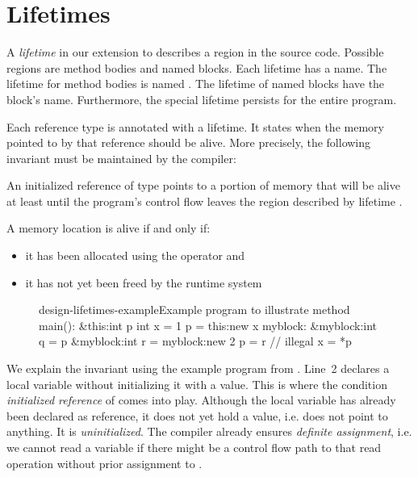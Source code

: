 \section{Lifetimes}\label{section:design-lifetimes}

A \emph{lifetime} in our extension to \whiley describes a region in the source code.
Possible regions are method bodies and named blocks.
Each lifetime has a name.
The lifetime for method bodies is named .
The lifetime of named blocks have the block's name.
Furthermore, the special lifetime \whileyinline{*} persists for the entire program.

Each reference type is annotated with a lifetime.
It states when the memory pointed to by that reference should be alive.
More precisely, the following invariant must be maintained by the compiler:

\begin{invariant}\label{invariant:alive}
An initialized reference of type  points to a portion of memory that will be alive at least until the program's control flow leaves the region described by lifetime .
\end{invariant}

\begin{definition}\label{definition:alive}
A memory location is alive if and only if:
\begin{itemize}
\item it has been allocated using the  operator and
\item it has not yet been freed by the runtime system
\end{itemize}
\end{definition}

\begin{figure}[t]
\begin{whileycodec}{design-lifetimes-example}{Example program to illustrate }
method main():
	&this:int p
	int x = 1
	p = this:new x
	myblock:
		&myblock:int q = p
		&myblock:int r = myblock:new 2
		p = r // illegal
	x = *p
\end{whileycodec}
\end{figure}

We explain the invariant using the example program from .
Line~2 declares a local variable  without initializing it with a value.
This is where the condition \emph{initialized reference} of  comes into play.
Although the local variable has already been declared as reference, it does not yet hold a value, i.e. does not point to anything.
It is \emph{uninitialized}.
The \whiley compiler already ensures \emph{definite assignment}, i.e. we cannot read a variable  if there might be a control flow path to that read operation without prior assignment to  \cite[pages 71, 82]{WLS}.

